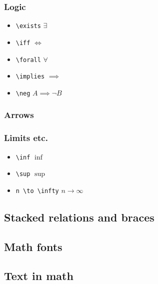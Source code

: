 \documentclass[a4paper]{article}
\begin{document}
\subsubsection{Logic}

\begin{itemize}
	\item \verb|\exists| \quad $\exists$
	\item \verb|\iff| \quad $\iff$
	\item \verb|\forall| \quad $\forall$
	\item \verb|\implies| \quad $\implies$
	\item \verb|\neg| \quad $A \implies \neg B$
\end{itemize}

\subsubsection{Arrows}


\subsubsection{Limits etc.}

\begin{itemize}
	\item \verb|\inf| $\inf$
	\item \verb|\sup| $\sup$
	\item \verb|n \to \infty| $n \to \infty$
\end{itemize}


\subsection{Stacked relations and braces}


\subsection{Math fonts}


\subsection{Text in math}
\end{document}
